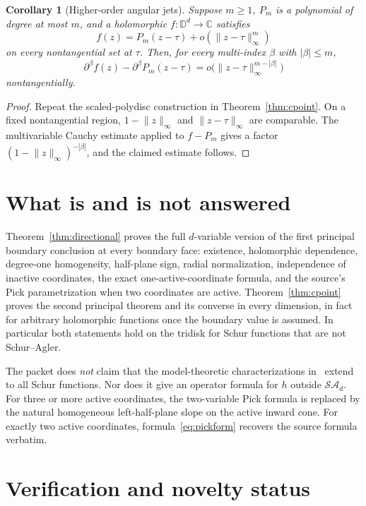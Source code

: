 \documentclass[11pt]{article}
\newtheorem{corollary}[theorem]{Corollary}
\theoremstyle{definition}
\theoremstyle{remark}
\newcommand{\D}{\mathbb D}
\newcommand{\C}{\mathbb C}
\newcommand{\norm}[1]{\lVert #1\rVert_\infty}
\newcommand{\SA}{\mathcal{SA}}
\begin{document}
\begin{corollary}[Higher-order angular jets]
\label{cor:jets}
Suppose \(m\ge1\), \(P_m\) is a polynomial of degree at most \(m\), and a holomorphic \(f:\D^d\to\C\) satisfies
\[
 f(z)=P_m(z-\tau)+o(\norm{z-\tau}^{m})
\]
on every nontangential set at \(\tau\).  Then, for every multi-index \(\beta\) with \(|\beta|\le m\),
\[
 \partial^\beta f(z)-\partial^\beta P_m(z-\tau)
 =o\bigl(\norm{z-\tau}^{m-|\beta|}\bigr)
\]
nontangentially.
\end{corollary}

\begin{proof}
Repeat the scaled-polydisc construction in Theorem~\ref{thm:cpoint}.  On a fixed nontangential region, \(1-\norm z\) and \(\norm{z-\tau}\) are comparable.  The multivariable Cauchy estimate applied to \(f-P_m\) gives a factor \((1-\norm z)^{-|\beta|}\), and the claimed estimate follows.
\end{proof}

\section{What is and is not answered}

Theorem~\ref{thm:directional} proves the full \(d\)-variable version of the first principal boundary conclusion at every boundary face: existence, holomorphic dependence, degree-one homogeneity, half-plane sign, radial normalization, independence of inactive coordinates, the exact one-active-coordinate formula, and the source's Pick parametrization when two coordinates are active.  Theorem~\ref{thm:cpoint} proves the second principal theorem and its converse in every dimension, in fact for arbitrary holomorphic functions once the boundary value is assumed.  In particular both statements hold on the tridisk for Schur functions that are not Schur--Agler.

The packet does \emph{not} claim that the model-theoretic characterizations in~\cite{AMY,AELY} extend to all Schur functions.  Nor does it give an operator formula for \(h\) outside \(\SA_d\).  For three or more active coordinates, the two-variable Pick formula is replaced by the natural homogeneous left-half-plane slope on the active inward cone.  For exactly two active coordinates, formula~\eqref{eq:pickform} recovers the source formula verbatim.

\section{Verification and novelty status}
\end{document}
